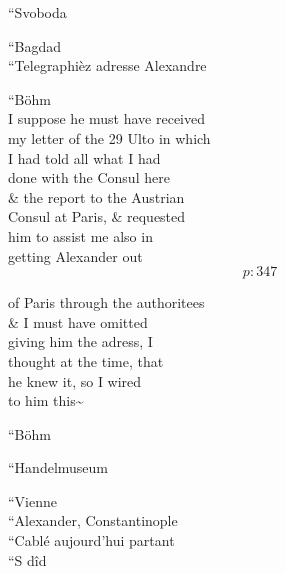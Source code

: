 \documentclass{report}
\begin{document}
	\par{
 	“Svoboda\ \\
	}

	\par{
 	“Bagdad\ \\“Telegraphièz adresse Alexandre\ \\
	}

	\par{
 	“Böhm\ \\I suppose he must have received\ \\my letter of the 29 Ulto in which\ \\I had told all what I had\ \\done with the Consul here\ \\\& the report to the Austrian\ \\Consul at Paris, \& requested\ \\him to assist me also in\ \\getting Alexander out\ \\
  \[p: 347 \]

	}



	\par{
 	of Paris through the authoritees\ \\\& I must have omitted\ \\giving him the adress, I\ \\thought at the time, that\ \\he knew it, so I wired\ \\to him this\~{}\ \\
	}

	\par{
 	“Böhm\ \\
	}

	\par{
 	“Handelmuseum\ \\
	}

	\par{
 	“Vienne\ \\“Alexander, Constantinople\ \\“Cablé aujourd’hui partant\ \\“S dîd\ \\
	}
\end{document}
